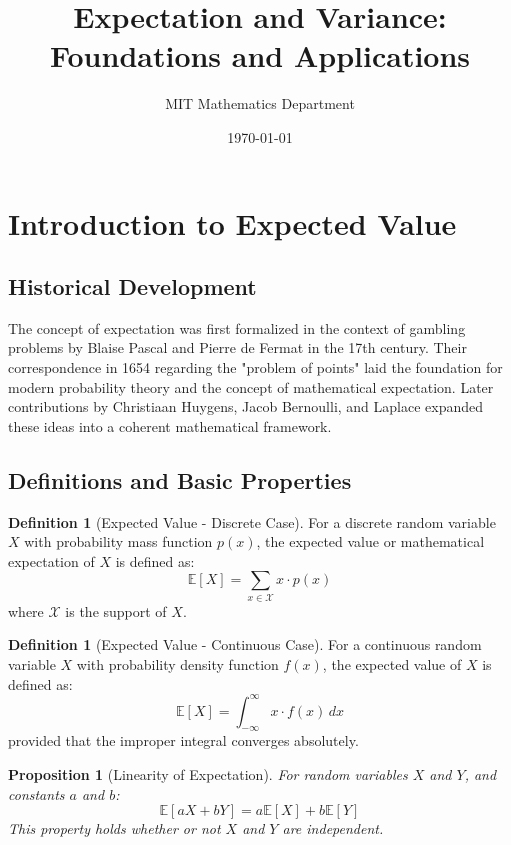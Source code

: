 \documentclass[12pt,a4paper]{article}
\title{Expectation and Variance: Foundations and Applications}
\author{MIT Mathematics Department}
\date{\today}
\theoremstyle{plain}
\newtheorem{proposition}[theorem]{Proposition}
\theoremstyle{definition}
\newtheorem{definition}[theorem]{Definition}
\begin{document}
\maketitle
\tableofcontents
\newpage

\section{Introduction to Expected Value}

\subsection{Historical Development}

The concept of expectation was first formalized in the context of gambling problems by Blaise Pascal and Pierre de Fermat in the 17th century. Their correspondence in 1654 regarding the "problem of points" laid the foundation for modern probability theory and the concept of mathematical expectation. Later contributions by Christiaan Huygens, Jacob Bernoulli, and Laplace expanded these ideas into a coherent mathematical framework.

\subsection{Definitions and Basic Properties}

\begin{definition}[Expected Value - Discrete Case]
For a discrete random variable $X$ with probability mass function $p(x)$, the expected value or mathematical expectation of $X$ is defined as:
\begin{equation}
\mathbb{E}[X] = \sum_{x \in \mathcal{X}} x \cdot p(x)
\end{equation}
where $\mathcal{X}$ is the support of $X$.
\end{definition}

\begin{definition}[Expected Value - Continuous Case]
For a continuous random variable $X$ with probability density function $f(x)$, the expected value of $X$ is defined as:
\begin{equation}
\mathbb{E}[X] = \int_{-\infty}^{\infty} x \cdot f(x) \, dx
\end{equation}
provided that the improper integral converges absolutely.
\end{definition}

\begin{proposition}[Linearity of Expectation]
For random variables $X$ and $Y$, and constants $a$ and $b$:
\begin{equation}
\mathbb{E}[aX + bY] = a\mathbb{E}[X] + b\mathbb{E}[Y]
\end{equation}
This property holds whether or not $X$ and $Y$ are independent.
\end{proposition}
\end{document}
